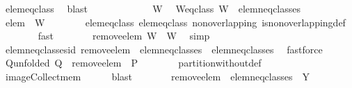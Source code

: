 \begin{isabellebody}
\ elem{\isacharunderscore}eq{\isacharunderscore}class{\isacharprime}\ \isamarkupfalse%
\ blast\isanewline
\ \ \isanewline
\ \ \isacommand{{\isacharbraceleft}}\isamarkupfalse%
\ \isanewline
\ \ \ \ \isamarkupfalse%
\ W\ \isamarkupfalse%
\ W{\isacharunderscore}eq{\isacharunderscore}class{\isacharcolon}\ {\isachardoublequoteopen}W\ {\isasymin}\ {\isacharquery}elem{\isacharunderscore}neq{\isacharunderscore}classes{\isachardoublequoteclose}\isanewline
\ \ \ \ \isamarkupfalse%
\ \isamarkupfalse%
\ {\isachardoublequoteopen}elem\ {\isasymnotin}\ W{\isachardoublequoteclose}\isanewline
\ \ \ \ \ \ \isamarkupfalse%
\ elem{\isacharunderscore}eq{\isacharunderscore}class\ elem{\isacharunderscore}eq{\isacharunderscore}class{\isacharprime}\ non{\isacharunderscore}overlapping\ is{\isacharunderscore}non{\isacharunderscore}overlapping{\isacharunderscore}def\isanewline
\ \ \ \ \ \ \isamarkupfalse%
\ fast\isanewline
\ \ \ \ \isamarkupfalse%
\ \isamarkupfalse%
\ {\isachardoublequoteopen}{\isacharquery}remove{\isacharunderscore}elem\ W\ {\isacharequal}\ W{\isachardoublequoteclose}\ \isamarkupfalse%
\ simp\isanewline
\ \ \isacommand{{\isacharbraceright}}\isamarkupfalse%
\isanewline
\ \ \isamarkupfalse%
\ \isamarkupfalse%
\ elem{\isacharunderscore}neq{\isacharunderscore}classes{\isacharunderscore}id{\isacharcolon}\ {\isachardoublequoteopen}{\isacharquery}remove{\isacharunderscore}elem\ {\isacharbackquote}\ {\isacharquery}elem{\isacharunderscore}neq{\isacharunderscore}classes\ {\isacharequal}\ {\isacharquery}elem{\isacharunderscore}neq{\isacharunderscore}classes{\isachardoublequoteclose}\ \isamarkupfalse%
\ fastforce\isanewline
\isanewline
\ \ \isamarkupfalse%
\ Q{\isacharunderscore}unfolded{\isacharcolon}\ {\isachardoublequoteopen}{\isacharquery}Q\ {\isacharequal}\ {\isacharquery}remove{\isacharunderscore}elem\ {\isacharbackquote}\ P\ {\isacharminus}\ {\isacharbraceleft}{\isacharbraceleft}{\isacharbraceright}{\isacharbraceright}{\isachardoublequoteclose}\isanewline
\ \ \ \ \isamarkupfalse%
\ partition{\isacharunderscore}without{\isacharunderscore}def\isanewline
\ \ \ \ \isamarkupfalse%
\ image{\isacharunderscore}Collect{\isacharunderscore}mem\isanewline
\ \ \ \ \isamarkupfalse%
\ blast\isanewline
\ \ \isamarkupfalse%
\ \isamarkupfalse%
\ {\isachardoublequoteopen}{\isasymdots}\ {\isacharequal}\ {\isacharquery}remove{\isacharunderscore}elem\ {\isacharbackquote}\ {\isacharparenleft}{\isacharquery}elem{\isacharunderscore}neq{\isacharunderscore}classes\ {\isasymunion}\ {\isacharbraceleft}Y{\isacharbraceright}{\isacharparenright}\ {\isacharminus}\ {\isacharbraceleft}{\isacharbraceleft}{\isacharbraceright}{\isacharbraceright}{\isachardoublequoteclose}\ \isamarkupfalse%

\end{isabellebody}
